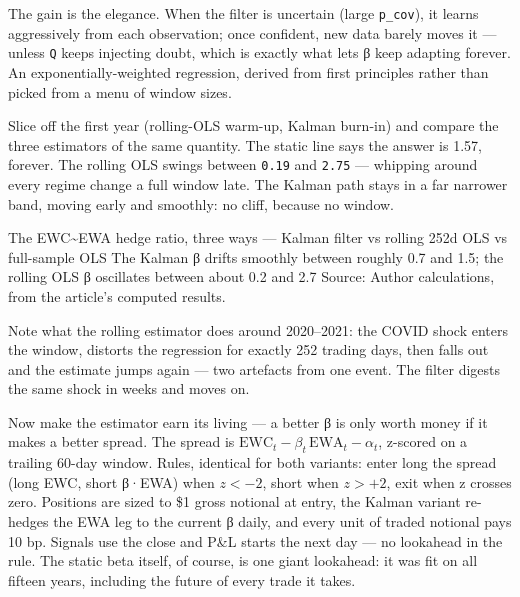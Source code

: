 \documentclass{pyportfolios-note}
\begin{document}
The gain is the elegance. When the filter is uncertain (large \texttt{p\_cov}), it
learns aggressively from each observation; once confident, new data barely moves
it — unless \texttt{Q} keeps injecting doubt, which is exactly what lets β keep
adapting forever. An exponentially-weighted regression, derived from first
principles rather than picked from a menu of window sizes.

\noteneedroom{190bp}

Slice off the first year (rolling-OLS warm-up, Kalman burn-in) and compare the
three estimators of the same quantity. The static line says the answer is 1.57,
forever. The rolling OLS swings between \texttt{0.19} and \texttt{2.75} — whipping
around every regime change a full window late. The Kalman path stays in a far
narrower band, moving early and smoothly: no cliff, because no window.

  {The EWC\textasciitilde EWA hedge ratio, three ways — Kalman filter vs rolling 252d OLS vs full-sample OLS}
  {The Kalman β drifts smoothly between roughly 0.7 and 1.5; the rolling OLS β
   oscillates between about 0.2 and 2.7}
  {Source: Author calculations, from the article's computed results.}

Note what the rolling estimator does around 2020–2021: the COVID shock enters the
window, distorts the regression for exactly 252 trading days, then falls out and
the estimate jumps again — two artefacts from one event. The filter digests the
same shock in weeks and moves on.

\noteneedroom{190bp}

Now make the estimator earn its living — a better β is only worth money if it
makes a better spread. The spread is
$\mathrm{EWC}_t - \beta_t\,\mathrm{EWA}_t - \alpha_t$, z-scored on a trailing
60-day window. Rules, identical for both variants: enter long the spread (long
EWC, short β·EWA) when $z < -2$, short when $z > +2$, exit when z crosses zero.
Positions are sized to \$1 gross notional at entry, the Kalman variant re-hedges
the EWA leg to the current β daily, and every unit of traded notional pays 10 bp.
Signals use the close and P\&L starts the next day — no lookahead in the rule. The
static beta itself, of course, is one giant lookahead: it was fit on all fifteen
years, including the future of every trade it takes.
\end{document}
